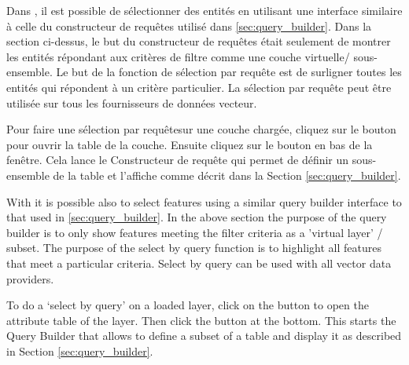 Dans \qg, il est possible de sélectionner des entités en utilisant une interface similaire à celle du constructeur de requêtes utilisé dans \ref{sec:query_builder}. Dans la section ci-dessus, le but du constructeur de requêtes était seulement de montrer les entités répondant aux critères de filtre comme une \og couche virtuelle\fg/ sous-ensemble. Le but de la fonction de sélection par requête est de surligner toutes les entités qui répondent à un critère particulier. La sélection par requête peut être utilisée sur tous les fournisseurs de données vecteur.

Pour faire une \og sélection par requête\fg sur une couche chargée, cliquez sur le bouton\\  pour ouvrir la table de la couche. Ensuite cliquez sur le bouton  en bas de la fenêtre. Cela lance le Constructeur de requête qui permet de définir un sous-ensemble de la table et l'affiche comme décrit dans la Section \ref{sec:query_builder}.

\label{sec:select_by_query}

With \qg it is possible also to select features using a similar query builder
interface to that used in \ref{sec:query_builder}. In the above section
the purpose of the query builder is to only show features meeting the
filter criteria as a 'virtual layer' / subset. The purpose of the select by
query function is to highlight all features that meet a particular criteria.
Select by query can be used with all vector data providers.

To do a `select by query' on a loaded layer, click on the
button  to open the attribute table of the layer. Then
click the  button at the bottom. This starts the Query Builder
that allows to define a subset of a table and display it as described in Section
\ref{sec:query_builder}.

